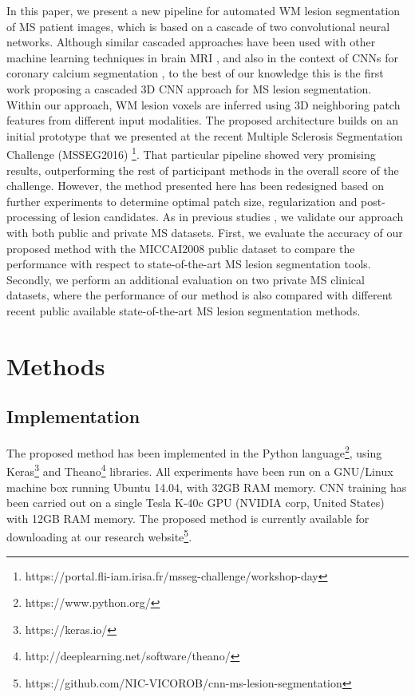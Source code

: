 \documentclass[11pt, authoryear,twocolumn, final]{elsarticle}
\begin{document}
In this paper, we present a new pipeline for automated WM lesion segmentation of MS patient images, which is based on a cascade of two convolutional neural networks. Although similar cascaded approaches have been used with other machine learning techniques in brain MRI \citep{Moeskops2015,Wang2015}, and also in the context of CNNs for coronary calcium segmentation \citep{Wolterink2016a}, to the best of our knowledge this is the first work proposing a cascaded 3D CNN approach for MS lesion segmentation. Within our approach, WM lesion voxels are inferred using 3D neighboring patch features from different input modalities. The proposed architecture builds on an initial prototype that we presented at the recent Multiple Sclerosis Segmentation Challenge (MSSEG2016) \citep{Commowick2016}\footnote{https://portal.fli-iam.irisa.fr/msseg-challenge/workshop-day}. That particular pipeline showed very promising results, outperforming the rest of participant methods in the overall score of the challenge. However, the method presented here has been redesigned based on further experiments to determine optimal patch size, regularization and post-processing of lesion candidates. As in previous studies \citep{Roura2015, Guizard2015, Strumia2016, Brosch2016}, we validate our approach with both public and private MS datasets. First, we evaluate the accuracy of our proposed method with the MICCAI2008  public dataset to compare the performance with respect to state-of-the-art MS lesion segmentation tools. Secondly, we perform an additional evaluation on two private MS clinical datasets, where the performance of our method is also compared with different recent public available state-of-the-art MS lesion segmentation methods. 

\section{Methods}
\label{sec:materials_methods}


\subsection{Implementation}

The proposed method has been implemented in the Python language\footnote{https://www.python.org/}, using Keras\footnote{https://keras.io/} and Theano\footnote{http://deeplearning.net/software/theano/} \citep{Bergstra2011} libraries. All experiments have been run on a GNU/Linux machine box running Ubuntu 14.04, with 32GB RAM memory. CNN training has been carried out on a single Tesla K-40c GPU (NVIDIA corp, United States) with 12GB RAM memory. The proposed method is currently available for downloading at our research website\footnote{https://github.com/NIC-VICOROB/cnn-ms-lesion-segmentation}. 
\end{document}
